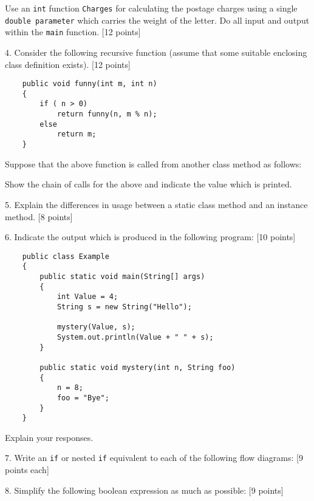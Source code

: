 Use an {\tt int} function {\tt Charges} for calculating
the postage charges using a single {\tt double parameter}
which carries the weight of the letter.  Do all input
and output within the {\tt main} function. [12 points]

4. Consider the following recursive function (assume that some
suitable enclosing class definition exists). [12 points]

\begin{verbatim}
    public void funny(int m, int n)
    {
        if ( n > 0)
            return funny(n, m % n);
        else
            return m;
    }
\end{verbatim}

Suppose that the above function is called from another class
method as follows:

\hspace*{.5in}{\tt System.out.println(funny(15, 12));}

Show the chain of calls for the above and indicate the
value which is printed.



5. Explain the differences in usage between a static class
method and an instance method.  [8 points]


6. Indicate the output which is produced in the following
program: [10 points]

\begin{verbatim}
    public class Example
    {
        public static void main(String[] args)
        {
            int Value = 4;
            String s = new String("Hello");

            mystery(Value, s);
            System.out.println(Value + " " + s);
        }

        public static void mystery(int n, String foo)
        {
            n = 8;
            foo = "Bye";
        }
    }
\end{verbatim}



Explain your responses.



7. Write an {\tt if} or nested {\tt if} equivalent to
each of the following flow diagrams: [9 points each]


8. Simplify the following boolean expression as much as
possible: [9 points]

\hspace*{.5in}{\tt (!( !(x>1)  || (y<3) ))}




